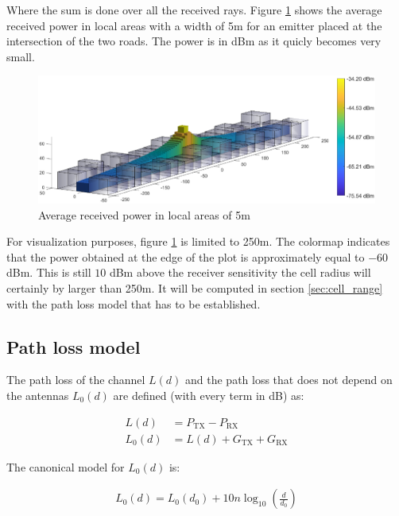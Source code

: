 \documentclass[10pt,a4paper]{ULBreport}
\begin{document}
Where the sum is done over all the received rays. Figure \ref{fig:average_power} shows the average received power in local areas with a width of 5m for an emitter placed at the intersection of the two roads. The power is in dBm as it quicly becomes very small. \\

\begin{figure}[H]
    \centering
    \includegraphics[width=1\textwidth]{3_5.eps}
    \caption{Average received power in local areas of 5m}
    \label{fig:average_power}
\end{figure}

For visualization purposes, figure \ref{fig:average_power} is limited to 250m. The colormap indicates that the power obtained at the edge of the plot is approximately equal to $-60$ dBm. This is still $10$ dBm above the receiver sensitivity the cell radius will certainly by larger than 250m. It will be computed in section \ref{sec:cell_range} with the path loss model that has to be established.

\subsection{Path loss model}
The path loss of the channel $L(d)$ and the path loss that does not depend on the antennas $L_0(d)$ are defined (with every term in dB) as:


\begin{subequations}
    \label{eq:path_loss}
    \begin{align}
        L(d) &= P_{\text{TX}} - P_{\text{RX}}\\
        L_0(d) &= L(d) + G_{\text{TX}} + G_{\text{RX}}
    \end{align}
\end{subequations}

The canonical model for $L_0(d)$ is:

\begin{align*}
    L_0(d) = L_0(d_0) + 10 n \log_{10} \left(\frac{d}{d_0}\right)
\end{align*}
\end{document}
